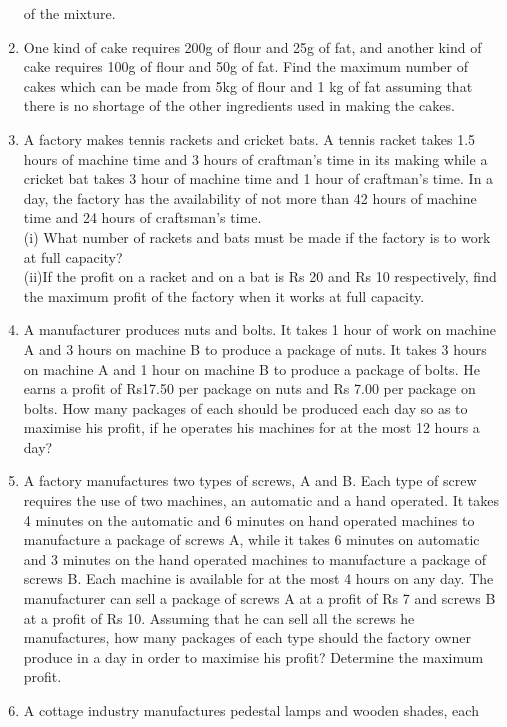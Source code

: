 \begin{enumerate}[label=\arabic*.,ref=\thesubsection.\theenumi]
of the mixture.\\
\item One kind of cake requires 200g of flour and 25g of fat, and another kind of cake
requires 100g of flour and 50g of fat. Find the maximum number of cakes which
can be made from 5kg of flour and 1 kg of fat assuming that there is no shortage
of the other ingredients used in making the cakes.\\
\item A factory makes tennis rackets and cricket bats. A tennis racket takes 1.5 hours
of machine time and 3 hours of craftman’s time in its making while a cricket bat
takes 3 hour of machine time and 1 hour of craftman’s time. In a day, the factory
has the availability of not more than 42 hours of machine time and 24 hours of
craftsman’s time.\\
(i) What number of rackets and bats must be made if the factory is to work
at full capacity?\\
(ii)If the profit on a racket and on a bat is Rs 20 and Rs 10 respectively, find
the maximum profit of the factory when it works at full capacity.\\
\item A manufacturer produces nuts and bolts. It takes 1 hour of work on machine A
and 3 hours on machine B to produce a package of nuts. It takes 3 hours on
machine A and 1 hour on machine B to produce a package of bolts. He earns a
profit of Rs17.50 per package on nuts and Rs 7.00 per package on bolts. How
many packages of each should be produced each day so as to maximise his
profit, if he operates his machines for at the most 12 hours a day?\\
\item A factory manufactures two types of screws, A and B. Each type of screw
requires the use of two machines, an automatic and a hand operated. It takes
4 minutes on the automatic and 6 minutes on hand operated machines to
manufacture a package of screws A, while it takes 6 minutes on automatic and
3 minutes on the hand operated machines to manufacture a package of screws
B. Each machine is available for at the most 4 hours on any day. The manufacturer
can sell a package of screws A at a profit of Rs 7 and screws B at a profit of
Rs 10. Assuming that he can sell all the screws he manufactures, how many
packages of each type should the factory owner produce in a day in order to
maximise his profit? Determine the maximum profit.\\
\item A cottage industry manufactures pedestal lamps and wooden shades, each

\end{enumerate}
